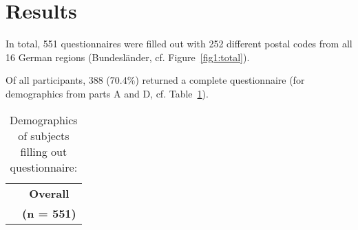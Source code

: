 \documentclass[a4paper,oneside,11pt,english]{scrartcl}
\begin{document}
\section*{Results}
In total, 551 questionnaires were filled out with 252 different postal codes from all 16 German regions (Bundesländer, cf. Figure~\ref{fig1:total}). 

Of all participants, 388 (70.4$\%$) returned a complete questionnaire (for demographics from parts A and D, cf. Table~\ref{table1}).

\begin{table}[h!]
	\caption{Demographics of subjects filling out questionnaire:}
	\label{table1}
	\begin{tabular}{p{10cm} c}
		\toprule
		&\textbf{Overall}\\ %
		& \textbf{(n = 551)}\\ \hline


\end{tabular}
\end{table}
\end{document}
